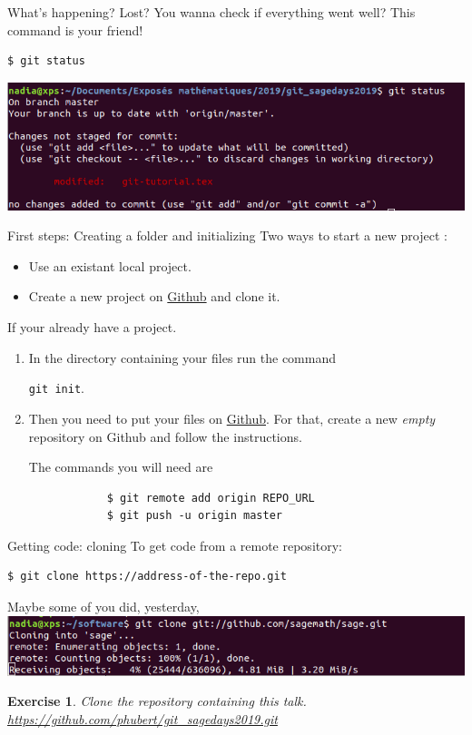 \documentclass{beamer}
\newtheorem{exo}{Exercise}
\begin{document}
	\begin{frame}[fragile]{What's happening?}
		Lost? You wanna check if everything went well? This command is your friend!
		\begin{verbatim}
$ git status
		\end{verbatim}
		\begin{center}
			\includegraphics[width=\linewidth]{status}
		\end{center}
	\end{frame}

	\begin{frame}[fragile]{First steps: Creating a folder and initializing}
		Two ways to start a new project : 
		\begin{itemize}
			\item Use an existant local project. 
			\item Create a new project on \href{https://github.com/}{Github} and clone it. \newline
		\end{itemize}
	
		If your already have a project.
		\begin{enumerate}
		\item  In the directory containing your files run the command 
		
		\texttt{git init}.
		
		\item  Then you need to put your files on  \href{https://github.com/}{Github}. For that, create a new \emph{empty} repository on Github and follow the instructions.
		
		The commands you will need are 
		\begin{verbatim}
			$ git remote add origin REPO_URL
			$ git push -u origin master
		\end{verbatim}
		
		\end{enumerate}   
	\end{frame}

	\begin{frame}[fragile]{Getting code: cloning}
	To get code from a remote repository:
	\begin{verbatim}
$ git clone https://address-of-the-repo.git
	\end{verbatim}
	Maybe some of you did, yesterday,
	\includegraphics[width=\linewidth]{clone}
	\pause
	\begin{exo}
		Clone the repository containing this talk.
		\url{https://github.com/phubert/git_sagedays2019.git}
	\end{exo}
	\end{frame}
\end{document}
